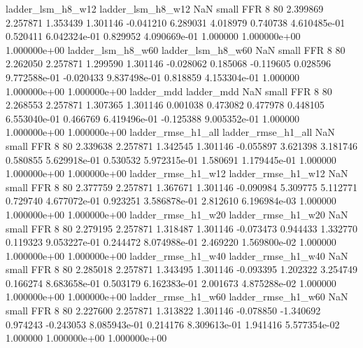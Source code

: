        ladder_lsm_h8_w12        ladder_lsm_h8_w12                   NaN      small      FFR                 8 80 2.399869       2.257871 1.353439       1.301146   -0.041210      6.289031      4.018979     0.740738   4.610485e-01  0.520411 6.042324e-01     0.829952   4.090669e-01            1.000000    1.000000e+00        1.000000e+00
       ladder_lsm_h8_w60        ladder_lsm_h8_w60                   NaN      small      FFR                 8 80 2.262050       2.257871 1.299590       1.301146   -0.028062      0.185068     -0.119605     0.028596   9.772588e-01 -0.020433 9.837498e-01     0.818859   4.153304e-01            1.000000    1.000000e+00        1.000000e+00
              ladder_mdd               ladder_mdd                   NaN      small      FFR                 8 80 2.268553       2.257871 1.307365       1.301146    0.001038      0.473082      0.477978     0.448105   6.553040e-01  0.466769 6.419496e-01    -0.125388   9.005352e-01            1.000000    1.000000e+00        1.000000e+00
      ladder_rmse_h1_all       ladder_rmse_h1_all                   NaN      small      FFR                 8 80 2.339638       2.257871 1.342545       1.301146   -0.055897      3.621398      3.181746     0.580855   5.629918e-01  0.530532 5.972315e-01     1.580691   1.179445e-01            1.000000    1.000000e+00        1.000000e+00
      ladder_rmse_h1_w12       ladder_rmse_h1_w12                   NaN      small      FFR                 8 80 2.377759       2.257871 1.367671       1.301146   -0.090984      5.309775      5.112771     0.729740   4.677072e-01  0.923251 3.586878e-01     2.812610   6.196984e-03            1.000000    1.000000e+00        1.000000e+00
      ladder_rmse_h1_w20       ladder_rmse_h1_w20                   NaN      small      FFR                 8 80 2.279195       2.257871 1.318487       1.301146   -0.073473      0.944433      1.332770     0.119323   9.053227e-01  0.244472 8.074988e-01     2.469220   1.569800e-02            1.000000    1.000000e+00        1.000000e+00
      ladder_rmse_h1_w40       ladder_rmse_h1_w40                   NaN      small      FFR                 8 80 2.285018       2.257871 1.343495       1.301146   -0.093395      1.202322      3.254749     0.166274   8.683658e-01  0.503179 6.162383e-01     2.001673   4.875288e-02            1.000000    1.000000e+00        1.000000e+00
      ladder_rmse_h1_w60       ladder_rmse_h1_w60                   NaN      small      FFR                 8 80 2.227600       2.257871 1.313822       1.301146   -0.078850     -1.340692      0.974243    -0.243053   8.085943e-01  0.214176 8.309613e-01     1.941416   5.577354e-02            1.000000    1.000000e+00        1.000000e+00
